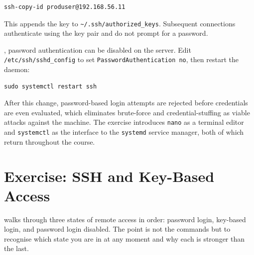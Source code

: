 \begin{verbatim}
ssh-copy-id produser@192.168.56.11
\end{verbatim}


This appends the key to \texttt{\~{}/.ssh/authorized\_keys}.
Subsequent connections authenticate using the key pair and do not prompt for a password.



, password authentication can be disabled on the server.
Edit \texttt{/etc/ssh/sshd\_config} to set \texttt{PasswordAuthentication no}, then restart the daemon:

\begin{verbatim}
sudo systemctl restart ssh
\end{verbatim}

After this change, password-based login attempts are rejected before credentials are even evaluated,
which eliminates brute-force and credential-stuffing as viable attacks against the machine.
The exercise introduces \texttt{nano} as a terminal editor
and \texttt{systemctl} as the interface to the \texttt{systemd} service manager,
both of which return throughout the course.






\newpage
\section{Exercise: SSH and Key-Based Access}

 walks through three states of remote access in order: password login, key-based login, and password login disabled. The point is not the commands but to recognise which state you are in at any moment and why each is stronger than the last.

